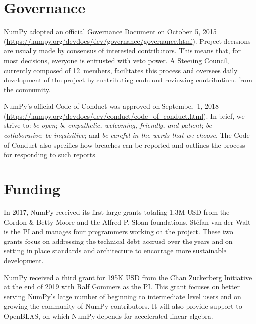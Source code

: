 \section*{Governance}

NumPy adopted an official Governance Document on October~5,
2015 (\url{https://numpy.org/devdocs/dev/governance/governance.html}).
Project decisions are usually made by consensus of interested contributors.
This means that, for most decisions, everyone is entrusted with veto power.
A Steering Council, currently composed of 12~members, facilitates this
process and oversees daily development of the project by contributing code
and reviewing contributions from the community.

NumPy's official Code of Conduct was approved on September~1, 2018
(\url{https://numpy.org/devdocs/dev/conduct/code_of_conduct.html}).
In brief, we strive to:
\emph{be open};
\emph{be empathetic, welcoming, friendly, and patient};
\emph{be collaborative};
\emph{be inquisitive}; and
\emph{be careful in the words that we choose}.
The Code of Conduct also specifies how breaches can be reported and outlines
the process for responding to such reports.

\section*{Funding}

In 2017, NumPy received its first large grants totaling 1.3M USD from the
Gordon \& Betty Moore and the Alfred P. Sloan foundations.
Stéfan van der Walt is the PI and manages four programmers working on the project.
These two grants focus on addressing the technical debt accrued over the years and
on setting in place standards and architecture to encourage more sustainable development.

NumPy received a third grant for 195K USD from the Chan Zuckerberg
Initiative at the end of 2019 with Ralf Gommers as the PI.
This grant focuses on better serving NumPy's large number of beginning
to intermediate level users and on growing the community of NumPy
contributors.
It will also provide support to OpenBLAS, on which NumPy depends for
accelerated linear algebra.

